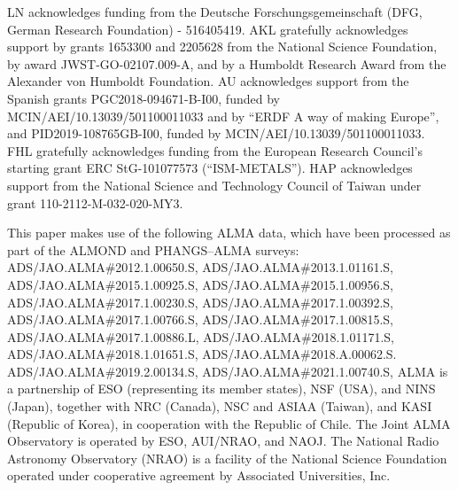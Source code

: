 \documentclass[letter, longauth]{aa} %
\begin{document}
\begin{acknowledgements}
LN acknowledges funding from the Deutsche Forschungsgemeinschaft (DFG, German Research Foundation) - 516405419.
AKL gratefully acknowledges support by grants 1653300 and 2205628 from the National Science Foundation, by award JWST-GO-02107.009-A, and by a Humboldt Research Award from the Alexander von Humboldt Foundation.
AU acknowledges support from the Spanish grants PGC2018-094671-B-I00, funded by MCIN/AEI/10.13039/501100011033 and by ``ERDF A way of making Europe'', and PID2019-108765GB-I00, funded by MCIN/AEI/10.13039/501100011033.
FHL gratefully acknowledges funding from the European Research Council’s starting grant ERC StG-101077573 (“ISM-METALS”).
HAP acknowledges support from the National Science and Technology Council of Taiwan under grant 110-2112-M-032-020-MY3.

This paper makes use of the following ALMA data, which have been processed as part of the ALMOND and PHANGS--ALMA surveys: \\
\noindent ADS/JAO.ALMA\#2012.1.00650.S, \linebreak %
ADS/JAO.ALMA\#2013.1.01161.S, \linebreak %
ADS/JAO.ALMA\#2015.1.00925.S, \linebreak %
ADS/JAO.ALMA\#2015.1.00956.S, \linebreak %
ADS/JAO.ALMA\#2017.1.00230.S, \linebreak %
ADS/JAO.ALMA\#2017.1.00392.S, \linebreak %
ADS/JAO.ALMA\#2017.1.00766.S, \linebreak %
ADS/JAO.ALMA\#2017.1.00815.S, \linebreak %
ADS/JAO.ALMA\#2017.1.00886.L, \linebreak %
ADS/JAO.ALMA\#2018.1.01171.S, \linebreak %
ADS/JAO.ALMA\#2018.1.01651.S, \linebreak %
ADS/JAO.ALMA\#2018.A.00062.S. \linebreak %
ADS/JAO.ALMA\#2019.2.00134.S, \linebreak %
ADS/JAO.ALMA\#2021.1.00740.S, \linebreak %
ALMA is a partnership of ESO (representing its member states), NSF (USA), and NINS (Japan), together with NRC (Canada), NSC and ASIAA (Taiwan), and KASI (Republic of Korea), in cooperation with the Republic of Chile. The Joint ALMA Observatory is operated by ESO, AUI/NRAO, and NAOJ. The National Radio Astronomy Observatory (NRAO) is a facility of the National Science Foundation operated under cooperative agreement by Associated Universities, Inc.


\end{acknowledgements}
\end{document}
